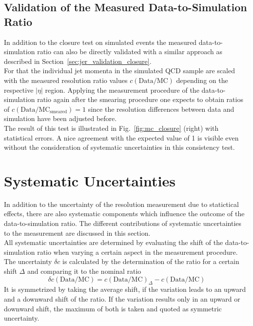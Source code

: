 \subsection{Validation of the Measured Data-to-Simulation Ratio}
\label{sec:jer_validation_ratio}
In addition to the closure test on simulated events the measured data-to-simulation ratio can also be directly validated with a similar approach as described in Section~\ref{sec:jer_validation_closure}.\\
For that the individual jet momenta in the simulated QCD sample are scaled with the measured resolution ratio values $c{(\mathrm{Data}/\mathrm{MC})}$ depending on the respective $|\eta|$ region. Applying the measurement procedure of the data-to-simulation ratio again after the smearing procedure one expects to obtain ratios of $c\mathrm{(Data/MC_{smeared})} = 1$ since the resolution differences between data and simulation have been adjusted before. \\
The result of this test is illustrated in Fig.~\ref{fig:mc_closure} (right) with statistical errors. A nice agreement with the expected value of 1 is visible even without the consideration of systematic uncertainties in this consistency test. 

\section{Systematic Uncertainties}
\label{sec:jer_syst_unc}
In addition to the uncertainty of the resolution measurement due to statictical effects, there are also systematic components which influence the outcome of the data-to-simulation ratio. The different contributions of systematic uncertainties to the measurement are discussed in this section.\\
All systematic uncertainties are determined by evaluating the shift of the data-to-simulation ratio when varying a certain aspect in the measurement procedure. The uncertainty $\delta c$ is calculated by the determination of the ratio for a certain shift $\Delta$ and comparing it to the nominal ratio 
 \begin{equation}
  \delta c{\mathrm{(Data/MC)}} = c{\mathrm{(Data/MC)}_{\Delta}} - c\mathrm{(Data/MC)}
 \end{equation} 
It is symmetrized by taking the average shift, if the variation leads to an upward and a downward shift of the ratio. If the variation results only in an upward or downward shift, the maximum of both is taken and quoted as symmetric uncertainty.  

